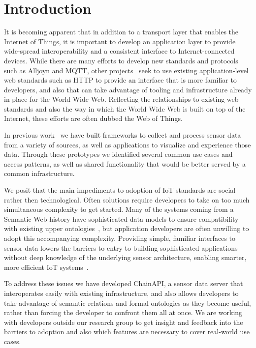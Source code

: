 \documentclass{acm_proc_article-sp}
\begin{document}
\section{Introduction}

It is becoming apparent that in addition to a transport layer that enables the
Internet of Things, it is important to develop an application layer to provide
wide-spread interoperability and a consistent interface to Internet-connected
devices. While there are many efforts to develop new standards and
protocols such as Alljoyn and MQTT, other projects~\cite{guinard2010} seek to
use existing application-level web standards such as HTTP to provide an
interface that is more familiar to developers, and also that can take advantage
of tooling and infrastructure already in place for the World Wide Web.
Reflecting the relationships to existing web standards and also the way in
which the World Wide Web is built on top of the Internet, these efforts are
often dubbed the Web of Things.

In previous work~\cite{doppellab}\cite{gestures} we have built frameworks to collect
and process sensor data from a variety of sources, as well as applications to
visualize and experience those data. Through these prototypes we identified
several common use cases and access patterns, as well as shared functionality
that would be better served by a common infrastructure.

We posit that the main impediments to adoption of IoT standards are social
rather then technological. Often solutions require developers to take on too much
simultaneous complexity to get started. Many of the systems coming from a Semantic
Web history have sophisticated data models to ensure compatibility with existing
upper ontologies~\cite{w3contology}\cite{broring2011}\cite{eid2007}, but
application developers are often unwilling to adopt this accompanying
complexity. Providing simple, familiar interfaces to sensor data lowers
the barriers to entry to building sophisticated applications without deep
knowledge of the underlying sensor architecture, enabling smarter, more
efficient IoT systems~\cite{aldrich2013}.

To address these issues we have developed ChainAPI, a sensor data server that
interoperates easily with existing infrastructure, and also allows developers
to take advantage of semantic relations and formal ontologies as they become
useful, rather than forcing the developer to confront them all at once. We are
working with developers outside our research group to get insight and feedback
into the barriers to adoption and also which features are necessary to cover
real-world use cases.
\end{document}
